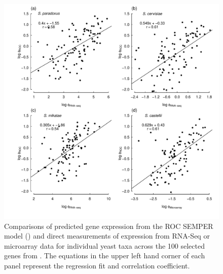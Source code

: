 \documentclass[12pt,letterpaper]{article}
\begin{document}
\begin{figure}[H]
  \centering
  \includegraphics[width=0.9\linewidth]{FIGURE_S2_Empirical_vs_ROC_by_spp.pdf}
  \caption{Comparisons of predicted gene expression from the ROC SEMPER model (\citet{GilchristEtAl2015}) and direct measurements of expression from RNA-Seq or microarray data for individual yeast taxa across the 100 selected genes from \citet{SalichosAndRokas2013}.
        The equations in the upper left hand corner of each panel represent the regression fit and correlation coefficient.
  }
  \label{fig:ROCvsEmpirical}
\end{figure}
\end{document}
